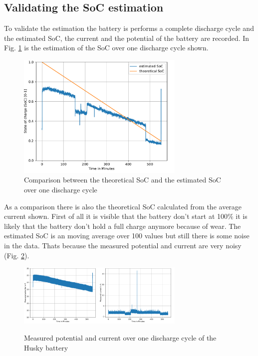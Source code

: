 \documentclass[conference]{IEEEtran}
\begin{document}
\subsection{Validating the SoC estimation}
To validate the estimation the battery is performs a complete discharge cycle and the estimated SoC, the current and the potential of the battery are recorded.
In Fig. \ref{fig:SoCUeberZeit} is the estimation of the SoC over one discharge cycle shown.\\

\begin{figure}[htbp]
    \centerline{\includegraphics[width=8cm]{Pictures/SoCUeberZeit.pdf}}
    \caption{Comparison between the theoretical SoC and the estimated SoC over one discharge cycle}
    \label{fig:SoCUeberZeit}
\end{figure}
As a comparison there is also the theoretical SoC calculated from the average current shown.
First of all it is visible that the battery don't start at 100\% it is likely that the battery don't hold a full charge anymore because of wear.
The estimated SoC is an moving average over 100 values but still there is some noise in the data.
Thats because the measured potential and current are very noisy (Fig. \ref{fig:SpannungStromUeberZeit}).
\begin{figure}[htbp]
    \centerline{\includegraphics[width=4cm]{Pictures/SpannungUeberZeit.pdf}\includegraphics[width=4cm]{Pictures/StormUeberZeit.pdf}}
    \caption{Measured potential and current over one discharge cycle of the Husky battery}
    \label{fig:SpannungStromUeberZeit}
\end{figure}
\end{document}
